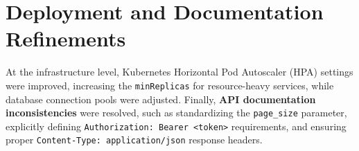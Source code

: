 \section{Deployment and Documentation Refinements}

At the infrastructure level, Kubernetes Horizontal Pod Autoscaler (HPA) settings were improved, increasing the \texttt{minReplicas} for resource-heavy services, while database connection pools were adjusted. Finally, \textbf{API documentation inconsistencies} were resolved, such as standardizing the \texttt{page\_size} parameter, explicitly defining \texttt{Authorization: Bearer <token>} requirements, and ensuring proper \texttt{Content-Type: application/json} response headers.
